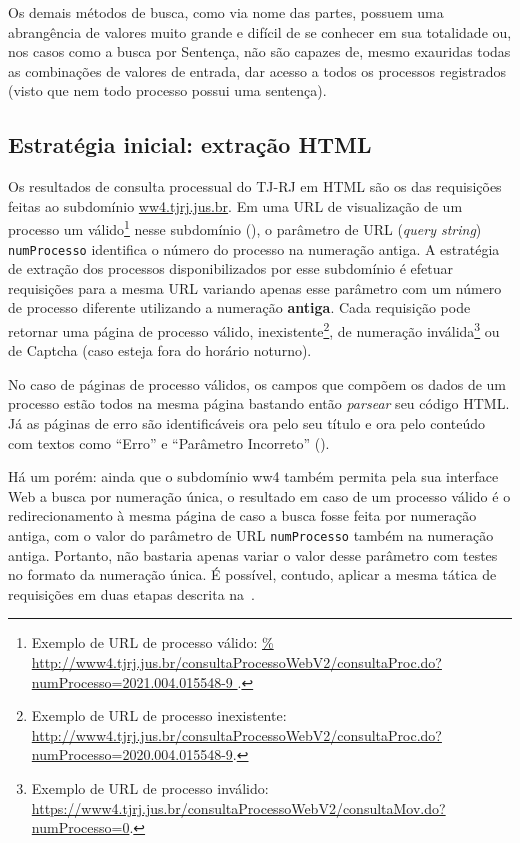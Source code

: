 Os demais métodos de busca, como via nome das partes, possuem uma abrangência
de valores muito grande e difícil de se conhecer em sua totalidade ou, nos
casos como a busca por Sentença, não são capazes de, mesmo exauridas todas as
combinações de valores de entrada, dar acesso a todos os processos registrados
(visto que nem todo processo possui uma sentença).

\subsection{Estratégia inicial: extração HTML}

\newcommand{\urlProcValido}{\url{%
    http://www4.tjrj.jus.br/consultaProcessoWebV2/consultaProc.do?numProcesso=2021.004.015548-9
}}

Os resultados de consulta processual do TJ-RJ em HTML são os das requisições
feitas ao subdomínio \url{ww4.tjrj.jus.br}. Em uma URL de visualização de um
processo um válido\footnote{Exemplo de URL de processo válido: \urlProcValido.}
nesse subdomínio (), o parâmetro de URL
(\textit{query string}) \texttt{numProcesso} identifica o número do processo na
numeração antiga. A estratégia de extração dos processos disponibilizados por
esse subdomínio é efetuar requisições para a mesma URL variando apenas esse
parâmetro com um número de processo diferente utilizando a numeração
\textbf{antiga}. Cada requisição pode retornar uma página de processo válido,
inexistente\footnote{Exemplo de URL de processo inexistente:
\url{http://www4.tjrj.jus.br/consultaProcessoWebV2/consultaProc.do?numProcesso=2020.004.015548-9}.},
de numeração inválida\footnote{Exemplo de URL de processo inválido:
\url{https://www4.tjrj.jus.br/consultaProcessoWebV2/consultaMov.do?numProcesso=0}.}
ou de Captcha (caso esteja fora do horário noturno).

No caso de páginas de processo válidos, os campos que compõem os dados de um
processo estão todos na mesma página bastando então \textit{parsear} seu código
HTML. Já as páginas de erro são identificáveis ora pelo seu título e ora pelo
conteúdo com textos como ``Erro'' e ``Parâmetro Incorreto''
().

Há um porém: ainda que o subdomínio ww4 também permita pela sua interface Web a
busca por numeração única, o resultado em caso de um processo válido é o
redirecionamento à mesma página de caso a busca fosse feita por numeração
antiga, com o valor do parâmetro de URL \texttt{numProcesso} também na
numeração antiga. Portanto, não bastaria apenas variar o valor desse parâmetro
com testes no formato da numeração única. É possível, contudo, aplicar a mesma
tática de requisições em duas etapas descrita
na~.

